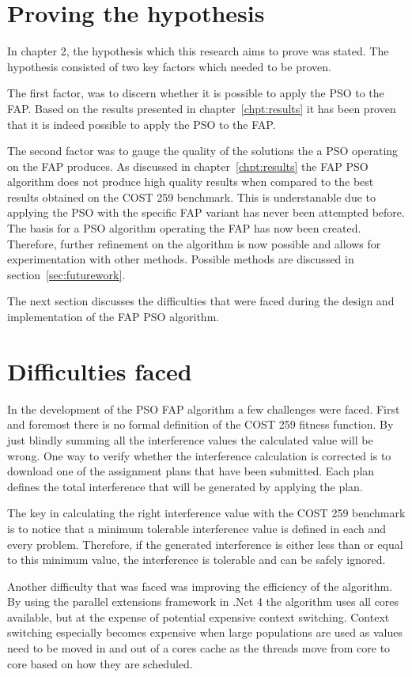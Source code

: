\section{Proving the hypothesis}
In chapter 2, the hypothesis which this research aims to prove was stated. The hypothesis consisted of two key factors which needed to be proven. 

The first factor, was to discern whether it is possible to apply the \gls{PSO} to the \gls{FAP}. Based on the results presented in chapter~\ref{chpt:results} it has been proven that it is indeed possible to apply the PSO to the FAP.

The second factor was to gauge the quality of the solutions the a PSO operating on the FAP produces. As discussed in chapter~\ref{chpt:results} the FAP PSO algorithm does not produce high quality results when compared to the best results obtained on the COST 259 benchmark. This is understanable due to applying the PSO with the specific FAP variant has never been attempted before. The basis for a PSO algorithm operating the FAP has now been created. Therefore, further refinement on the algorithm is now possible and allows for experimentation with other methods. Possible methods are discussed in section~\ref{sec:futurework}.

The next section discusses the difficulties that were faced during the design and implementation of the FAP PSO algorithm. 
\section{Difficulties faced}
In the development of the PSO FAP algorithm a few challenges were faced. First and foremost there is no formal definition of the COST 259 fitness function. By just blindly summing all the interference values the calculated value will be wrong. One way to verify whether the interference calculation is corrected is to download one of the assignment plans that have been submitted. Each plan defines the total interference that will be generated by applying the plan. 

The key in calculating the right interference value with the COST 259 benchmark is to notice that a minimum tolerable interference value is defined in each and every problem. Therefore, if the generated interference is either less than or equal to this minimum value, the interference is tolerable and can be safely ignored.

Another difficulty that was faced was improving the efficiency of the algorithm. By using the parallel extensions framework in .Net 4 the algorithm uses all cores available, but at the expense of potential expensive context switching. Context switching especially becomes expensive when large populations are used as values need to be moved in and out of a cores cache as the threads move from core to core based on how they are scheduled.

